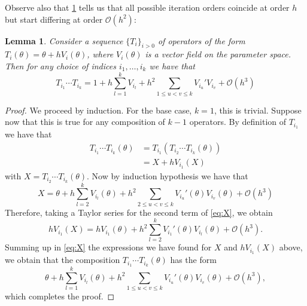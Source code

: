 \documentclass[10pt]{article} %
\theoremstyle{plain}
\newtheorem{lemma}[theorem]{Lemma}
\theoremstyle{definition}
\theoremstyle{remark}
\begin{document}
Observe also that \cref{lemma:commutation} tells us that all possible iteration orders coincide at order $h$ but start differing at order $\mathcal O(h^2)$:

\begin{lemma} \label{lemma:commutation}
Consider a sequence $\{T_i\}_{i > 0}$ of operators of the form $T_i(\theta) = \theta + h V_i(\theta)$, where $V_i(\theta)$ is a vector field on the parameter space. Then for any choice of indices $i_1, \dots, i_k$ we have that
\begin{equation*}
    T_{i_1}  \cdots T_{i_k}=  
    1
    + h \sum_{l=1}^k V_{i_l}
    + h^2 \sum_{1\leq u < v \leq k} V_{i_u}' V_{i_v}
    + \mathcal O(h^3)
\end{equation*}
 
\end{lemma}

\begin{proof}
    We proceed by induction. For the base case, $k=1$, this is trivial. Suppose now that this is true for any composition of $k-1$ operators. By definition of $T_{i_1}$ we have that
    \begin{equation}
        \begin{aligned}
            T_{i_1}\cdots T_{i_k}(\theta) 
            & = T_{i_1}(T_{i_2}\cdots T_{i_k}(\theta)) \\
            & = X + h V_{i_1}(X) 
        \end{aligned}
        \label{eq:X}
    \end{equation}
    with $X = T_{i_2}\cdots T_{i_k}(\theta)$. Now by induction hypothesis we have that
    \begin{equation}
        X = \theta + h\sum_{l=2}^{k} V_{i_l}(\theta) + h^2 \sum_{2\leq u < v \leq k} V_{i_u}'(\theta) V_{i_v}(\theta) + \mathcal O(h^3)
    \end{equation}
    Therefore, taking a Taylor series for the second term of \cref{eq:X}, we obtain
    \begin{equation}
    hV_{i_1}(X) = hV_{i_1}(\theta) + h^2 \sum_{l=2}^k V_{i_1}'(\theta) V_{i_l}(\theta) +\mathcal O(h^3).
    \end{equation}
    Summing up in \cref{eq:X} the expressions we have found for $X$ and $hV_{i_1}(X)$ above, we obtain that the composition $T_{i_1}\cdots T_{i_k}(\theta)$ has the form
    \begin{equation*}
    \theta + h\sum_{l=1}^{k} V_{i_l}(\theta) + h^2 \sum_{1\leq u < v \leq k} V_{i_u}'(\theta) V_{i_v}(\theta) + \mathcal O(h^3),
    \end{equation*}
    which completes the proof.
\end{proof}
\end{document}
